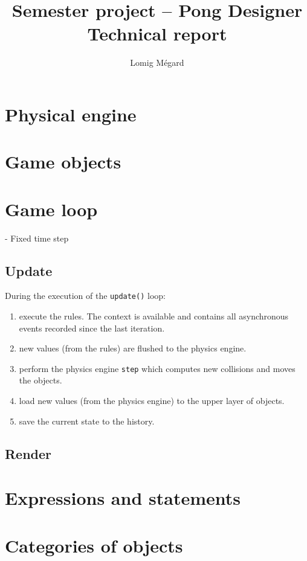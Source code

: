 \documentclass[11pt,a4paper]{article}
\title{Semester project -- Pong Designer\\Technical report}
\author{Lomig Mégard}
\begin{document}
\maketitle

\section{Physical engine}


\section{Game objects}



\section{Game loop}

- Fixed time step

\subsection*{Update}

During the execution of the \texttt{update()} loop:
\begin{enumerate}
\item execute the rules. The context is available and contains all asynchronous events recorded since the last iteration.
\item new values (from the rules) are flushed to the physics engine.
\item perform the physics engine \texttt{step} which computes new collisions and moves the objects.
\item load new values (from the physics engine) to the upper layer of objects.
\item save the current state to the history.
\end{enumerate}

\subsection*{Render}

\section{Expressions and statements}


\section{Categories of objects}
\end{document}
